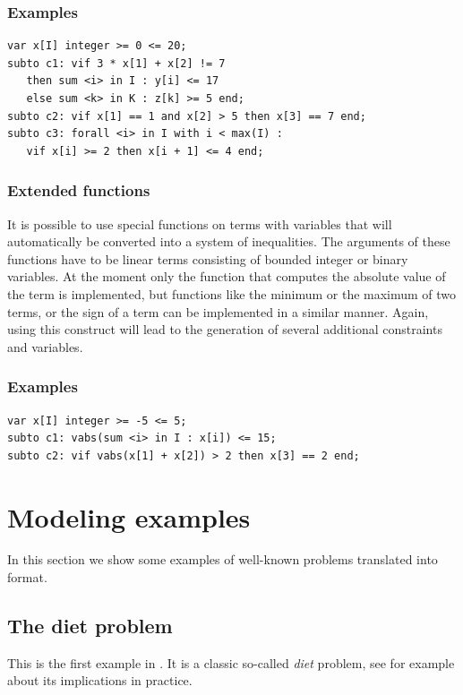 \subsubsection{Examples}
{\small
\begin{verbatim}
var x[I] integer >= 0 <= 20;
subto c1: vif 3 * x[1] + x[2] != 7
   then sum <i> in I : y[i] <= 17
   else sum <k> in K : z[k] >= 5 end;
subto c2: vif x[1] == 1 and x[2] > 5 then x[3] == 7 end;
subto c3: forall <i> in I with i < max(I) :
   vif x[i] >= 2 then x[i + 1] <= 4 end;
\end{verbatim}
}

\subsubsection{Extended functions}
It is possible to use special functions on terms with variables that
will automatically be converted into a system of inequalities. The
arguments of these functions have to be linear terms consisting of
bounded integer or binary variables. At the moment only the function
 that computes the absolute value of the term 
is implemented, but functions like the minimum or the maximum of two
terms, or the sign of a term can be implemented in a similar manner.
Again, using this construct will lead to
the generation of several additional constraints and variables.

\subsubsection{Examples}
{\small
\begin{verbatim}
var x[I] integer >= -5 <= 5;
subto c1: vabs(sum <i> in I : x[i]) <= 15;
subto c2: vif vabs(x[1] + x[2]) > 2 then x[3] == 2 end;
\end{verbatim}
}




\clearpage
\section{Modeling examples}\label{modelingexamples}
In this section we show some examples of well-known problems
translated into \zimpl format.

\subsection{The diet problem}
This is the first example in
\cite[Chapter 1, page 3]{Chvatal1983}.
It is a classic so-called \emph{diet} problem, see for example
\cite{Dantzig1990} about its implications in practice.

